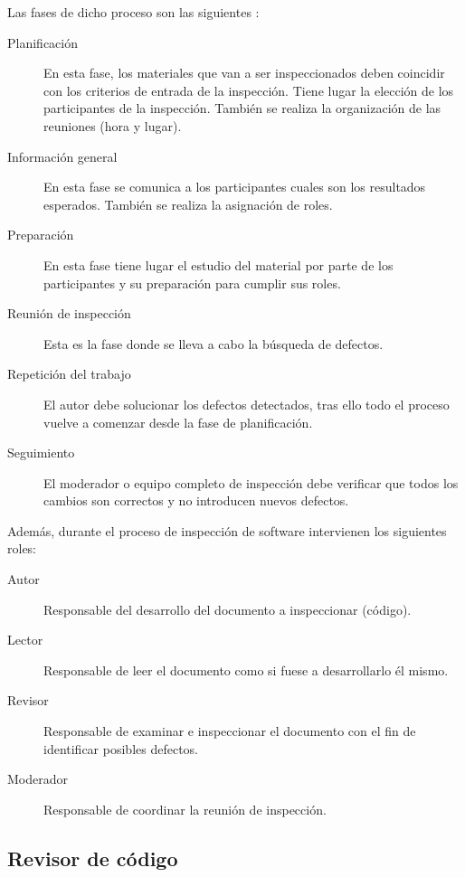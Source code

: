 Las fases de dicho proceso son las siguientes \cite{Fagan:1986:ASI:10677.2412491}:

\begin{description}
	\item[Planificación] En esta fase, los materiales que van a ser inspeccionados deben coincidir con los criterios de entrada de la inspección. Tiene lugar la elección de los participantes de la inspección. También se realiza la organización de las reuniones (hora y lugar).
	\item[Información general] En esta fase se comunica a los participantes cuales son los resultados esperados. También se realiza la asignación de roles.
	\item[Preparación] En esta fase tiene lugar el estudio del material por parte de los participantes y su preparación para cumplir sus roles.
	\item[Reunión de inspección] Esta es la fase donde se lleva a cabo la búsqueda de defectos.
	\item[Repetición del trabajo] El autor debe solucionar los defectos detectados, tras ello todo el proceso vuelve a comenzar desde la fase de planificación.
	\item[Seguimiento] El moderador o equipo completo de inspección debe verificar que todos los cambios son correctos y no introducen nuevos defectos.
\end{description}


Además, durante el proceso de inspección de software intervienen los siguientes roles:

\begin{description}
	\item[Autor] Responsable del desarrollo del documento a inspeccionar (código).
	\item[Lector] Responsable de leer el documento como si fuese a desarrollarlo él mismo.
	\item[Revisor] Responsable de examinar e inspeccionar el documento con el fin de identificar posibles defectos.
	\item[Moderador] Responsable de coordinar la reunión de inspección.
\end{description}

\subsection{Revisor de código}


